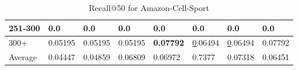 \begin{table*}[]
\begin{tabular}{|l|l|l|l|l|l|l||l|}
        251-300     & 0.0                            & 0.0                            & 0.0                            & 0.0                            & 0.0                            & 0.0                             & 0.0                        \\ \hline
        300+        & 0.05195                        & 0.05195                        & 0.05195                        & \textbf{0.07792}               & {\ul 0.06494}                  & {\ul 0.06494}                   & 0.07792                    \\ \hline
        Average     & 0.04447                        & 0.04859                        & 0.06809                        & 0.06972                        & 0.7377                         & 0.07318                         & 0.06451                    \\ \hline
    \end{tabular}
    \caption{Recall@50 for Amazon-Cell-Sport}
    \label{tab:Amazon-Cell-Sport-recall-evaluation}
\end{table*}